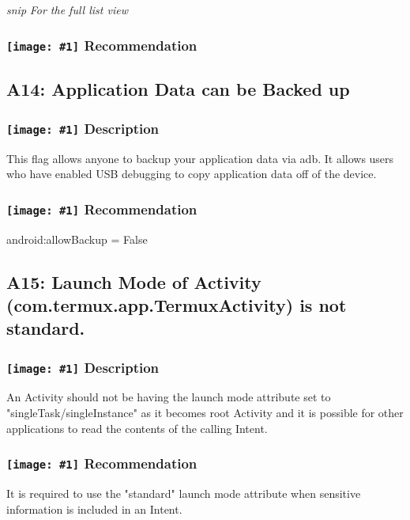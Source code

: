 \documentclass[12p]{article}
\newcommand{\icon}[1]{\texttt{[image: \#1]}}
\begin{document}
\textit{snip}
\newline \textsl{For the full list view }
\subsubsection*{\protect\icon{/home/miki/Documents/GITHUB/AndroidPermissions/python/vulns/report_icons/basic_todo.png} Recommendation}

\subsection{A14: Application Data can be Backed up}
\subsubsection*{\protect\icon{/home/miki/Documents/GITHUB/AndroidPermissions/python/vulns/report_icons/basic_sheet.png} Description}
This flag allows anyone to backup your application data via adb. It allows users who have enabled USB debugging to copy application data off of the device.
\subsubsection*{\protect\icon{/home/miki/Documents/GITHUB/AndroidPermissions/python/vulns/report_icons/basic_todo.png} Recommendation}
android:allowBackup = False
\subsection{A15: Launch Mode of Activity (com.termux.app.TermuxActivity) is not standard.}
\subsubsection*{\protect\icon{/home/miki/Documents/GITHUB/AndroidPermissions/python/vulns/report_icons/basic_sheet.png} Description}
An Activity should not be having the launch mode attribute set to "singleTask/singleInstance" as it becomes root Activity and it is possible for other applications to read the contents of the calling Intent.
\subsubsection*{\protect\icon{/home/miki/Documents/GITHUB/AndroidPermissions/python/vulns/report_icons/basic_todo.png} Recommendation}
It is required to use the "standard" launch mode attribute when sensitive information is included in an Intent.
\end{document}
